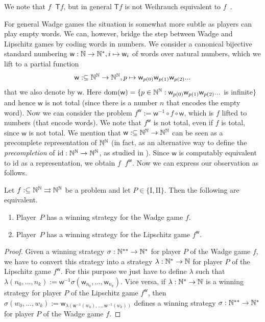 \documentclass{amsart}
\def\IN{{\Bbb{N}}}
\def\In{\subseteq}
\def\mto{\rightrightarrows}
\def\T{{\mathsf{{T}}}}
\def\w{{\mathsf{{w}}}}
\def\w{\mathsf{w}}
\def\leqW{\mathop{\leq_{\mathrm{W}}}}
\def\equivSW{\mathop{\equiv_{\mathrm{sW}}}}
\def\leqW{\mathop{\leq_{\mathrm{W}}}}
\def\equivSW{\mathop{\equiv_{\mathrm{sW}}}}
\def\id{{\mathrm{id}}}
\def\dom{{\mathrm{dom}}}
\def\graph{{\mathrm{graph}}}
\begin{document}
We note that $f\leqW\T f$, but in general $\T f$ is not Weihrauch equivalent to $f$~\cite{BG21a}.

For general Wadge games the situation is somewhat more subtle as players can play empty words.
We can, however, bridge the step between Wadge and Lipschitz games by coding words in numbers.
We consider a canonical bijective standard numbering $\w:\IN\to\IN^*,i\mapsto\w_i$ of words over natural numbers, 
which we lift to a partial function
\[\w:\In\IN^\IN\to\IN^\IN,p\mapsto\w_{p(0)}\w_{p(1)}\w_{p(2)}...\]
that we also denote by $\w$. Here $\dom(\w)=\{p\in\IN^\IN:\w_{p(0)}\w_{p(1)}\w_{p(2)}...$ is infinite$\}$
and hence $\w$ is not total (since there is a number $n$ that encodes the empty word).
Now we can consider the problem $f^\w:=\w^{-1}\circ f\circ\w$, which is $f$ lifted to numbers (that encode words).
We note that $f^\w$ is not total, even if $f$ is total, since $\w$ is not total.
We mention that $\w:\In\IN^\IN\to\IN^\IN$ can be seen as a precomplete representation of $\IN^\IN$ (in fact, as an alternative way to define the {\em precompletion} of $\id:\IN^\IN\to\IN^\IN$, as studied in \cite{BG20,BG21a}). 
Since $\w$ is computably equivalent to $\id$ as a representation, we
obtain $f\equivSW f^\w$.
Now we can express our observation as follows.

\begin{proposition}
\label{prop:Wadge-Lipschitz}
Let $f:\In\IN^\IN\mto\IN^\IN$ be a problem and let $P\in\{\mathrm{I, II}\}$. Then the following are equivalent.
\begin{enumerate}
\item Player~$P$ has a winning strategy for the Wadge game $f$.
\item Player~$P$ has a winning strategy for the Lipschitz game $f^\w$.
\end{enumerate}
\end{proposition}
\begin{proof}
Given a winning strategy $\sigma:\IN^{**}\to\IN^*$ for player $P$ of the Wadge game $f$, we have to convert this strategy
into a strategy $\lambda:\IN^*\to\IN$ for player $P$ of the Lipschitz game $f^\w$.
For this purpose we just have to define $\lambda$ such that $\lambda(n_0,...,n_k):=\w^{-1}\sigma(\w_{n_0},...,\w_{n_k})$.
Vice versa, if $\lambda:\IN^*\to\IN$ is a winning strategy for player $P$ of the Lipschitz game $f^\w$, then
$\sigma(w_0,...,w_k):=\w_{\lambda(\w^{-1}(w_0),...,\w^{-1}(w_k))}$ defines a winning strategy $\sigma:\IN^{**}\to\IN^*$
for player $P$ of the Wadge game $f$.
\end{proof}
\end{document}
